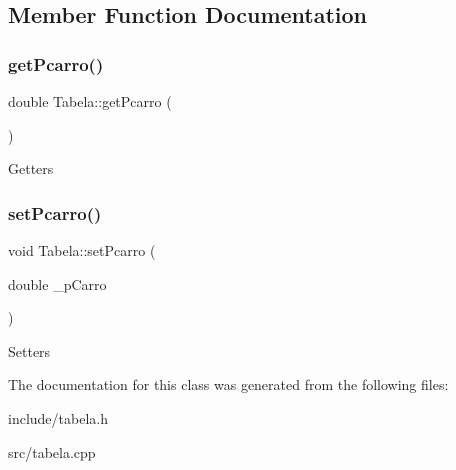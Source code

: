 \subsection{Member Function Documentation}
\mbox{\label{classTabela_af8df006567638a44fec8e0951b794c4b}} 
\subsubsection{\texorpdfstring{get\+Pcarro()}{getPcarro()}}
{\footnotesize\ttfamily double Tabela\+::get\+Pcarro (\begin{DoxyParamCaption}{ }\end{DoxyParamCaption})}

Getters \mbox{\label{classTabela_a6b811be8b22906f261c7bfc93f39386b}} 
\subsubsection{\texorpdfstring{set\+Pcarro()}{setPcarro()}}
{\footnotesize\ttfamily void Tabela\+::set\+Pcarro (\begin{DoxyParamCaption}\item[{double}]{\+\_\+p\+Carro }\end{DoxyParamCaption})}

Setters 

The documentation for this class was generated from the following files\+:\begin{DoxyCompactItemize}
\item 
include/tabela.\+h\item 
src/tabela.\+cpp\end{DoxyCompactItemize}
